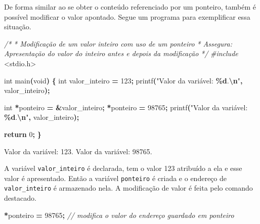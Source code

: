 \documentclass[
  11pt,
  a4paper,
]{scrbook}
\newenvironment{Shaded}{\begin{snugshade}}{\end{snugshade}}
\newcommand{\CommentTok}[1]{\textcolor[rgb]{0.56,0.35,0.01}{\textit{#1}}}
\newcommand{\ControlFlowTok}[1]{\textcolor[rgb]{0.13,0.29,0.53}{\textbf{#1}}}
\newcommand{\DataTypeTok}[1]{\textcolor[rgb]{0.13,0.29,0.53}{#1}}
\newcommand{\DecValTok}[1]{\textcolor[rgb]{0.00,0.00,0.81}{#1}}
\newcommand{\ImportTok}[1]{#1}
\newcommand{\NormalTok}[1]{#1}
\newcommand{\OperatorTok}[1]{\textcolor[rgb]{0.81,0.36,0.00}{\textbf{#1}}}
\newcommand{\PreprocessorTok}[1]{\textcolor[rgb]{0.56,0.35,0.01}{\textit{#1}}}
\newcommand{\SpecialCharTok}[1]{\textcolor[rgb]{0.81,0.36,0.00}{\textbf{#1}}}
\newcommand{\StringTok}[1]{\textcolor[rgb]{0.31,0.60,0.02}{#1}}
\begin{document}
De forma similar ao se obter o conteúdo referenciado por um ponteiro,
também é possível modificar o valor apontado. Segue um programa para
exemplificar essa situação.

\begin{Shaded}
\begin{Highlighting}[]
\CommentTok{/*}
\CommentTok{ * Modificação de um valor inteiro com uso de um ponteiro}
\CommentTok{ * Assegura: Apresentação do valor do inteiro antes e depois da modificação}
\CommentTok{ */}
\PreprocessorTok{\#include }\ImportTok{\textless{}stdio.h\textgreater{}}

\DataTypeTok{int}\NormalTok{ main}\OperatorTok{(}\DataTypeTok{void}\OperatorTok{)} \OperatorTok{\{}
    \DataTypeTok{int}\NormalTok{ valor\_inteiro }\OperatorTok{=} \DecValTok{123}\OperatorTok{;}
\NormalTok{    printf}\OperatorTok{(}\StringTok{"Valor da variável: }\SpecialCharTok{\%d}\StringTok{.}\SpecialCharTok{\textbackslash{}n}\StringTok{"}\OperatorTok{,}\NormalTok{ valor\_inteiro}\OperatorTok{);}

    \DataTypeTok{int} \OperatorTok{*}\NormalTok{ponteiro }\OperatorTok{=} \OperatorTok{\&}\NormalTok{valor\_inteiro}\OperatorTok{;}
    \OperatorTok{*}\NormalTok{ponteiro }\OperatorTok{=} \DecValTok{98765}\OperatorTok{;}
\NormalTok{    printf}\OperatorTok{(}\StringTok{"Valor da variável: }\SpecialCharTok{\%d}\StringTok{.}\SpecialCharTok{\textbackslash{}n}\StringTok{"}\OperatorTok{,}\NormalTok{ valor\_inteiro}\OperatorTok{);}

    \ControlFlowTok{return} \DecValTok{0}\OperatorTok{;}
\OperatorTok{\}}
\end{Highlighting}
\end{Shaded}

\begin{Shaded}
\begin{Highlighting}[]
\NormalTok{Valor da variável: 123.}
\NormalTok{Valor da variável: 98765.}
\end{Highlighting}
\end{Shaded}

A variável \texttt{valor\_inteiro} é declarada, tem o valor 123
atribuído a ela e esse valor é apresentado. Então a variável
\texttt{ponteiro} é criada e o endereço de \texttt{valor\_inteiro} é
armazenado nela. A modificação de valor é feita pelo comando destacado.

\begin{Shaded}
\begin{Highlighting}[]
\OperatorTok{*}\NormalTok{ponteiro }\OperatorTok{=} \DecValTok{98765}\OperatorTok{;}  \CommentTok{// modifica o valor do endereço guardado em ponteiro}
\end{Highlighting}
\end{Shaded}
\end{document}
